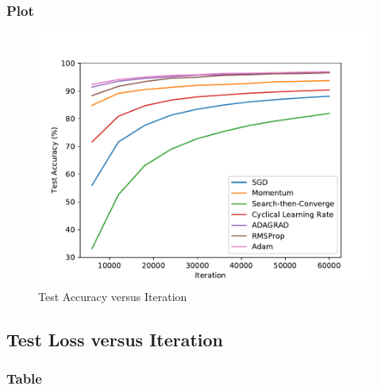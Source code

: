 \documentclass{article}
\begin{document}
\subsubsection{Plot}
\begin{figure}[H]
	\includegraphics[width=\textwidth, keepaspectratio]{TestAcc.pdf}
	\caption{Test Accuracy versus Iteration}
\end{figure}
\subsection{Test Loss versus Iteration}
\subsubsection{Table}
\end{document}
